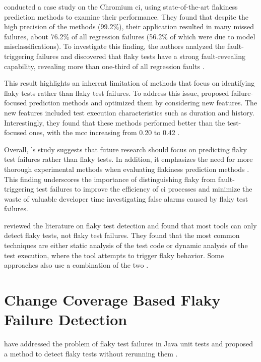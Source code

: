  conducted a case study on the Chromium \ac{ci}, using state-of-the-art flakiness prediction methods to examine their performance.
They found that despite the high precision of the methods (99.2\%), their application resulted in many missed failures, about 76.2\% of all regression failures (56.2\% of which were due to model misclassifications).
To investigate this finding, the authors analyzed the fault-triggering failures and discovered that flaky tests have a strong fault-revealing capability, revealing more than one-third of all regression faults \autocite{haben_importance_2023}.

This result highlights an inherent limitation of methods that focus on identifying flaky tests rather than flaky test failures.
To address this issue,  proposed failure-focused prediction methods and optimized them by considering new features.
The new features included test execution characteristics such as duration and history.
Interestingly, they found that these methods performed better than the test-focused ones, with the \ac{mcc} increasing from 0.20 to 0.42 \autocite{haben_importance_2023}.

Overall, \citeauthor*{haben_importance_2023}'s study suggests that future research should focus on predicting flaky test failures rather than flaky tests.
In addition, it emphasizes the need for more thorough experimental methods when evaluating flakiness prediction methods \autocite{haben_importance_2023}.
This finding underscores the importance of distinguishing flaky from fault-triggering test failures to improve the efficiency of \ac{ci} processes and minimize the waste of valuable developer time investigating false alarms caused by flaky test failures.

 reviewed the literature on flaky test detection and found that most tools can only detect flaky tests, not flaky test failures.
They found that the most common techniques are either static analysis of the test code or dynamic analysis of the test execution, where the tool attempts to trigger flaky behavior.
Some approaches also use a combination of the two \autocite{rasheed_test_2022}.
\section{Change Coverage Based Flaky Failure Detection}

 have addressed the problem of flaky test failures in Java unit tests and proposed a method to detect flaky tests without rerunning them \autocite{bell_deflaker_2018}.

